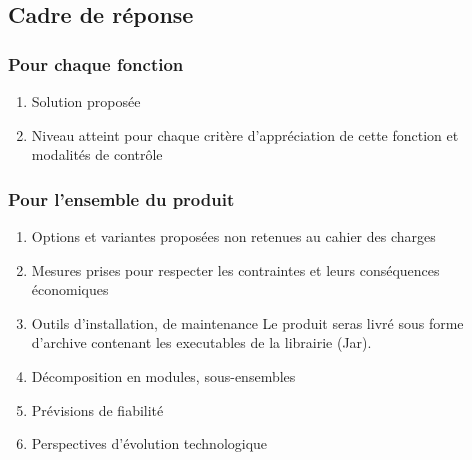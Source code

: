 \subsection{Cadre de réponse}

\subsubsection{Pour chaque fonction}
\begin{enumerate}
\item{Solution proposée}
\item{Niveau atteint pour chaque critère d’appréciation de cette fonction et modalités de contrôle}
\end{enumerate}

\subsubsection{Pour l’ensemble du produit}
\begin{enumerate}
\item{Options et variantes proposées non retenues au cahier des charges}
\item{Mesures prises pour respecter les contraintes et leurs conséquences économiques}

\item{Outils d’installation, de maintenance}
Le produit seras livré sous forme d'archive contenant les executables de la librairie (Jar).


\item{Décomposition en modules, sous-ensembles}
\item{Prévisions de fiabilité}
\item{ Perspectives d’évolution technologique}
\end{enumerate}